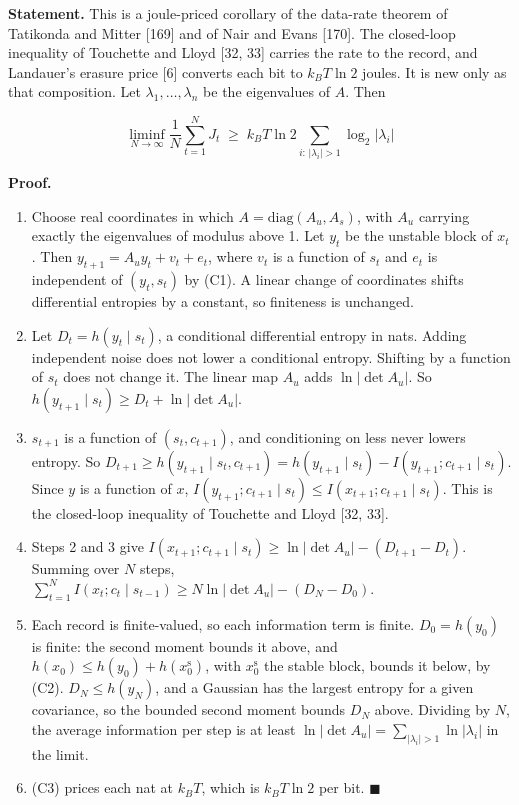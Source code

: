 \documentclass[
  10pt,
]{article}
\providecommand{\tightlist}{%
  \setlength{\itemsep}{0pt}\setlength{\parskip}{0pt}}
\begin{document}
\textbf{Statement.} This is a joule-priced corollary of the data-rate
theorem of Tatikonda and Mitter {[}169{]} and of Nair and Evans
{[}170{]}. The closed-loop inequality of Touchette and Lloyd {[}32,
33{]} carries the rate to the record, and Landauer's erasure price
{[}6{]} converts each bit to \(k_B T\ln 2\) joules. It is new only as
that composition. Let \(\lambda_1, \dots, \lambda_n\) be the eigenvalues
of \(A\). Then

\[\liminf_{N\to\infty} \frac{1}{N}\sum_{t=1}^{N} J_t \;\ge\; k_B T \ln 2 \sum_{i:\,|\lambda_i| > 1} \log_2 |\lambda_i|\]

\textbf{Proof.}

\begin{enumerate}
\def\labelenumi{\arabic{enumi}.}
\tightlist
\item
  Choose real coordinates in which \(A = \mathrm{diag}(A_u, A_s)\), with
  \(A_u\) carrying exactly the eigenvalues of modulus above 1. Let
  \(y_t\) be the unstable block of \(x_t\). Then
  \(y_{t+1} = A_u y_t + v_t + e_t\), where \(v_t\) is a function of
  \(s_t\) and \(e_t\) is independent of \((y_t, s_t)\) by (C1). A linear
  change of coordinates shifts differential entropies by a constant, so
  finiteness is unchanged.
\item
  Let \(D_t = h(y_t \mid s_t)\), a conditional differential entropy in
  nats. Adding independent noise does not lower a conditional entropy.
  Shifting by a function of \(s_t\) does not change it. The linear map
  \(A_u\) adds \(\ln|\det A_u|\). So
  \(h(y_{t+1} \mid s_t) \ge D_t + \ln|\det A_u|\).
\item
  \(s_{t+1}\) is a function of \((s_t, c_{t+1})\), and conditioning on
  less never lowers entropy. So
  \(D_{t+1} \ge h(y_{t+1}\mid s_t, c_{t+1}) = h(y_{t+1}\mid s_t) - I(y_{t+1}; c_{t+1} \mid s_t)\).
  Since \(y\) is a function of \(x\),
  \(I(y_{t+1}; c_{t+1}\mid s_t) \le I(x_{t+1}; c_{t+1}\mid s_t)\). This
  is the closed-loop inequality of Touchette and Lloyd {[}32, 33{]}.
\item
  Steps 2 and 3 give
  \(I(x_{t+1}; c_{t+1}\mid s_t) \ge \ln|\det A_u| - (D_{t+1} - D_t)\).
  Summing over \(N\) steps,
  \(\sum_{t=1}^{N} I(x_t; c_t\mid s_{t-1}) \ge N \ln|\det A_u| - (D_N - D_0)\).
\item
  Each record is finite-valued, so each information term is finite.
  \(D_0 = h(y_0)\) is finite: the second moment bounds it above, and
  \(h(x_0) \le h(y_0) + h(x^{\mathrm{s}}_0)\), with \(x^{\mathrm{s}}_0\)
  the stable block, bounds it below, by (C2). \(D_N \le h(y_N)\), and a
  Gaussian has the largest entropy for a given covariance, so the
  bounded second moment bounds \(D_N\) above. Dividing by \(N\), the
  average information per step is at least
  \(\ln|\det A_u| = \sum_{|\lambda_i|>1}\ln|\lambda_i|\) in the limit.
\item
  (C3) prices each nat at \(k_B T\), which is \(k_B T\ln 2\) per bit.
  \(\blacksquare\)
\end{enumerate}
\end{document}
